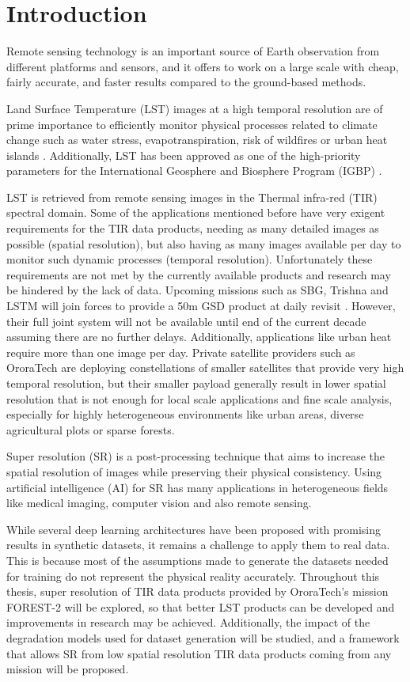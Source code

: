 \section{Introduction} \label{sec:intro}


Remote sensing technology is an important source of Earth observation from different platforms
and sensors, and it offers to work on a large scale with cheap, fairly accurate, and faster results compared to the ground-based methods.

Land Surface Temperature (LST) images at a high temporal resolution are of prime importance to efficiently monitor physical processes related to climate change such as water stress, evapotranspiration, risk of wildfires or urban heat islands \cite{lst2005}.
Additionally, LST has been approved as one of the high-priority parameters for the International Geosphere and Biosphere Program (IGBP) \cite{townshend94}.

LST is retrieved from remote sensing images in the Thermal infra-red (TIR) spectral domain.  
Some of the applications mentioned before have very exigent requirements for the TIR data products, needing as many detailed images as possible (spatial resolution), but also having as many images available per day to monitor such dynamic processes (temporal resolution).
Unfortunately these requirements are not met by the currently available products and research may be hindered by the lack of data. 
Upcoming missions such as SBG, Trishna and LSTM will join forces to provide a 50m GSD product at daily revisit \cite{author2023thermal}. However, their full joint system will not be available until end of the current decade assuming there are no further delays. Additionally, applications like urban heat require more than one image per day.
Private satellite providers such as OroraTech are deploying constellations of smaller satellites that provide very high temporal resolution, but their smaller payload generally result in lower spatial resolution that is not enough for local scale applications and fine scale analysis, especially for highly heterogeneous environments like urban areas, diverse agricultural plots or sparse forests.

Super resolution (SR) is a post-processing technique that aims to increase the spatial resolution of images while preserving their physical consistency.
Using artificial intelligence (AI) for SR has many applications in heterogeneous fields like medical imaging, computer vision and also remote sensing. 

While several deep learning architectures have been proposed with promising results in synthetic datasets, it remains a challenge to apply them to real data.
This is because most of the assumptions made to generate the datasets needed for training do not represent the physical reality accurately.
Throughout this thesis, super resolution of TIR data products provided by OroraTech's mission FOREST-2 will be explored, so that better LST products can be developed and improvements in research may be achieved.
Additionally, the impact of the degradation models used for dataset generation will be studied, and a framework that allows SR from low spatial resolution TIR data products coming from any mission will be proposed.
 
